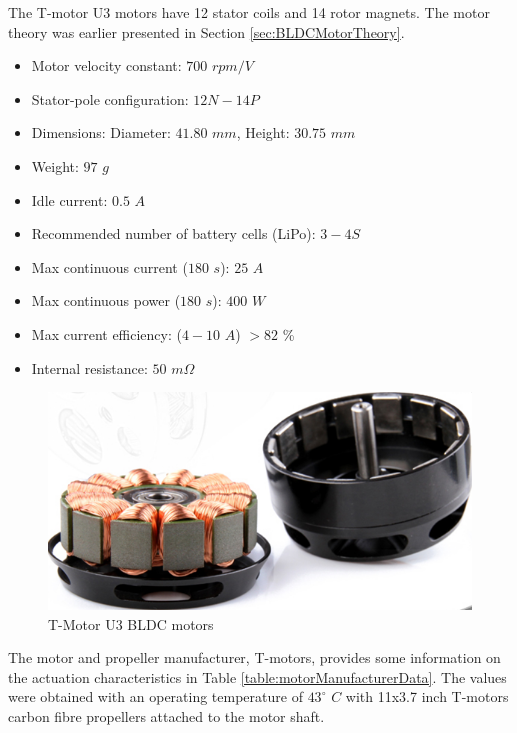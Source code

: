 \documentclass[a4paper]{report}
\begin{document}
The T-motor U3 motors have 12 stator coils and 14 rotor magnets. The motor theory was earlier presented in Section \ref{sec:BLDCMotorTheory}.

\begin{itemize}
  \item Motor velocity constant: $700$ $rpm/V$
  \item Stator-pole configuration: $12N-14P$
  \item Dimensions: Diameter: $41.80$ $mm$, Height: $30.75$ $mm$
  \item Weight: $97$ $g$
  \item Idle current: $0.5$ $A$
  \item Recommended number of battery cells (LiPo): $3-4S$
  \item Max continuous current ($180$ $s$): $25$ $A$
  \item Max continuous power ($180$ $s$): $400$ $W$
  \item Max current efficiency: ($4-10$ $A$) $>82$ \%
  \item Internal resistance: $50$ $m\Omega$
\end{itemize}

\begin{figure}[h]
    \centering
    \includegraphics[scale=0.6]{images/tmotoru3open.png}
    \caption{T-Motor U3 BLDC motors}
    \label{fig:tmotoru3open}
\end{figure}

The motor and propeller manufacturer, T-motors, provides some information on the actuation characteristics in Table \ref{table:motorManufacturerData}. The values were obtained with an operating temperature of $43^{\circ}$ $C$ with 11x3.7 inch T-motors carbon fibre propellers attached to the motor shaft.
\end{document}
